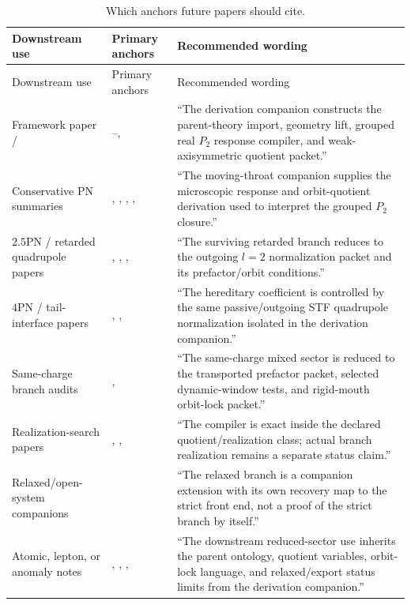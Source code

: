 \begin{longtable}{L{0.24\textwidth}L{0.30\textwidth}L{0.36\textwidth}}
\caption{Which anchors future papers should cite.}\label{tab:downstream-anchor-crosswalk}\\
\toprule
Downstream use & Primary anchors & Recommended wording \\
\midrule
\endfirsthead
\toprule
Downstream use & Primary anchors & Recommended wording \\
\midrule
\endhead
Framework paper /  & --,  & ``The derivation companion constructs the parent-theory import, geometry lift, grouped real \(P_2\) response compiler, and weak-axisymmetric quotient packet.'' \\
\addlinespace
Conservative PN summaries & , , , ,  & ``The moving-throat companion supplies the microscopic response and orbit-quotient derivation used to interpret the grouped \(P_2\) closure.'' \\
\addlinespace
\(2.5\)PN / retarded quadrupole papers & , , ,  & ``The surviving retarded branch reduces to the outgoing \(l=2\) normalization packet and its prefactor/orbit conditions.'' \\
\addlinespace
\(4\)PN / tail-interface papers & , ,  & ``The hereditary coefficient is controlled by the same passive/outgoing STF quadrupole normalization isolated in the derivation companion.'' \\
\addlinespace
Same-charge branch audits & ,  & ``The same-charge mixed sector is reduced to the transported prefactor packet, selected dynamic-window tests, and rigid-mouth orbit-lock packet.'' \\
\addlinespace
Realization-search papers & , ,  & ``The compiler is exact inside the declared quotient/realization class; actual branch realization remains a separate status claim.'' \\
\addlinespace
Relaxed/open-system companions &  & ``The relaxed branch is a companion extension with its own recovery map to the strict front end, not a proof of the strict branch by itself.'' \\
\addlinespace
Atomic, lepton, or anomaly notes & , , ,  & ``The downstream reduced-sector use inherits the parent ontology, quotient variables, orbit-lock language, and relaxed/export status limits from the derivation companion.'' \\
\bottomrule
\end{longtable}

